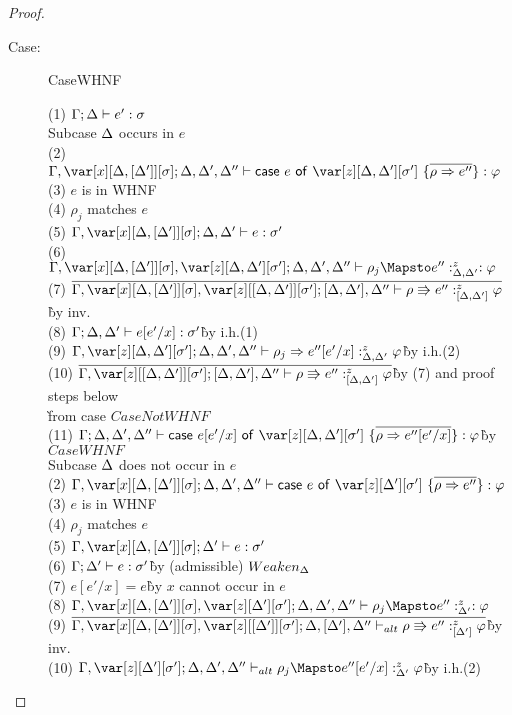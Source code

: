 \begin{proof}
\begin{description}
\item[Case:] CaseWHNF
\begin{tabbing}
    (1) $\Gamma; \Delta \vdash e' : \sigma$\\
    Subcase $\Delta$ occurs in $e$\\
    (2) $\G,\xD;\D,\D',\D'' \vdash \ccase{e}{\z[\D,\D'][\s']~\{\ov{\rho \Rightarrow e''}\}} : \vp$\\
    (3) $e$ is in WHNF\\
    (4) $\rho_j$ matches $e$\\
    (5) $\G,\xD;\D,\D' \vdash e : \s'$\\
    (6) $\G,\xD,\z[\D,\D'][\s']; \D,\D',\D'' \vdash \rho_j \Mapsto e'' :^z_{\D,\D'} : \vp$\\
    (7) $\ov{\G,\xD,\z[\irr{\D,\D'}][\s']; [\D,\D'],\D'' \vdash\rho \Rrightarrow e'' :^z_{\irr{\D,\D'}} \vp}$\` by inv.\\
    (8) $\Gamma;\Delta,\Delta' \vdash e[e'/x] : \sigma'$\` by i.h.(1)\\
    (9) $\G,\z[\D,\D'][\s']; \D,\D',\D'' \vdash\rho_j \Rightarrow e''[e'/x] :^z_{\D,\D'} \vp $\` by i.h.(2)\\
    (10) $\ov{\G,\z[\irr{\D,\D'}][\s']; [\D,\D'],\D'' \vdash \rho \Rrightarrow e'' :^z_{\irr{\D,\D'}} \vp}$\` by (7) and proof steps below\\\`from case $CaseNotWHNF$\\
    (11) $\G;\D,\D',\D'' \vdash \ccase{e[e'/x]}{\z[\D,\D'][\s']~\{\ov{\rho \Rightarrow e''[e'/x]}\}} : \vp$\` by $CaseWHNF$\\
    Subcase $\Delta$ does not occur in $e$\\
    (2) $\G,\xD;\D,\D',\D'' \vdash \ccase{e}{\z[\D'][\s']~\{\ov{\rho \Rightarrow e''}\}} : \vp$\\
    (3) $e$ is in WHNF\\
    (4) $\rho_j$ matches $e$\\
    (5) $\G,\xD;\D' \vdash e : \s'$\\
    (6) $\Gamma;\Delta' \vdash e : \sigma'$\` by (admissible) $Weaken_\Delta$\\
    (7) $e[e'/x] = e$\` by $x$ cannot occur in $e$\\
    (8) $\G,\xD,\z[\D'][\s']; \D,\D',\D'' \vdash \rho_j \Mapsto e'' :^z_{\D'} : \vp$\\
    (9) $\ov{\G,\xD,\z[\irr{\D'}][\s']; \D,[\D'],\D'' \vdash_{alt} \rho \Rrightarrow e'' :^z_{\irr{\D'}} \vp}$\` by inv.\\
    (10) $\G,\z[\D'][\s']; \D,\D',\D'' \vdash_{alt} \rho_j \Mapsto e''[e'/x] :^z_{\D'} \vp$\` by i.h.(2)\\

\end{tabbing}
\end{description}
\end{proof}
